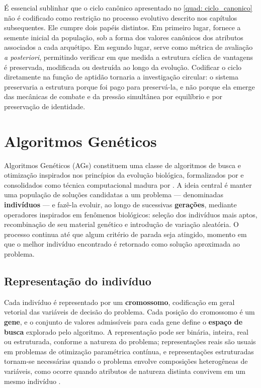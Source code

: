 É essencial sublinhar que o ciclo canônico apresentado no \autoref{quad: ciclo_canonico} não é codificado como restrição no processo evolutivo descrito nos capítulos subsequentes. Ele cumpre dois papéis distintos. Em primeiro lugar, fornece a semente inicial da população, sob a forma dos valores canônicos dos atributos associados a cada arquétipo. Em segundo lugar, serve como métrica de avaliação \textit{a posteriori}, permitindo verificar em que medida a estrutura cíclica de vantagens é preservada, modificada ou destruída ao longo da evolução. Codificar o ciclo diretamente na função de aptidão tornaria a investigação circular: o sistema preservaria a estrutura porque foi pago para preservá-la, e não porque ela emerge das mecânicas de combate e da pressão simultânea por equilíbrio e por preservação de identidade.

\section{Algoritmos Genéticos}
\label{sec: ag}

Algoritmos Genéticos (AGs) constituem uma classe de algoritmos de busca e otimização inspirados nos princípios da evolução biológica, formalizados por  e consolidados como técnica computacional madura por . A ideia central é manter uma população de soluções candidatas a um problema --- denominadas \textbf{indivíduos} --- e fazê-la evoluir, ao longo de sucessivas \textbf{gerações}, mediante operadores inspirados em fenômenos biológicos: seleção dos indivíduos mais aptos, recombinação de seu material genético e introdução de variação aleatória. O processo continua até que algum critério de parada seja atingido, momento em que o melhor indivíduo encontrado é retornado como solução aproximada ao problema.

\subsection{Representação do indivíduo}

Cada indivíduo é representado por um \textbf{cromossomo}, codificação em geral vetorial das variáveis de decisão do problema. Cada posição do cromossomo é um \textbf{gene}, e o conjunto de valores admissíveis para cada gene define o \textbf{espaço de busca} explorado pelo algoritmo. A representação pode ser binária, inteira, real ou estruturada, conforme a natureza do problema; representações reais são usuais em problemas de otimização paramétrica contínua, e representações estruturadas tornam-se necessárias quando o problema envolve composições heterogêneas de variáveis, como ocorre quando atributos de natureza distinta convivem em um mesmo indivíduo \cite{eiben2015introduction,mitchell1998introduction}.

